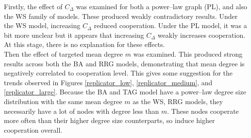 Firstly, the effect of $C_\Delta$ was examined for both a power--law graph (PL), and also the WS family of models. These produced weakly contradictory results. Under the WS model, increasing $C_\Delta$ reduced cooperation. Under the PL model, it was a bit more unclear but it appears that increasing $C_\Delta$ weakly increases cooperation. At this stage, there is no explanation for these effects. \\

Then the effect of targeted mean degree $m$ was examined. This produced strong results across both the BA and RRG models, demonstrating that mean degree is negatively correlated to cooperation level. This gives some suggestion for the trends observed in Figures \ref{replicator_low}, \ref{replicator_medium}, and \ref{replicator_large}. Because the BA and TAG model have a power--law degree size distribution with the same mean degree $m$ as the WS, RRG models, they necessarily have a lot of nodes with degree less than $m$. These nodes cooperate more often than their higher degree size counterparts, so induce higher cooperation overall. 
